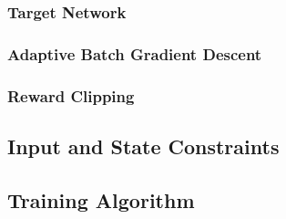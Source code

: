 \subsubsection{Target Network}
\subsubsection{Adaptive Batch Gradient Descent}
\subsubsection{Reward Clipping}
\subsection{Input and State Constraints}
\subsection{Training Algorithm}

